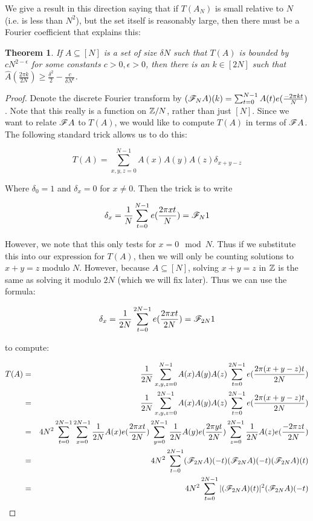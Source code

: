 \documentclass{article}
\newtheorem{theorem}{Theorem}[section]
\theoremstyle{definition}
\theoremstyle{remark}
\numberwithin{equation}{section}
\begin{document}
We give a result in this direction saying that if $T(A_N)$ is small
relative to $N$ (i.e. is less than $N^2$), but the set itself is
reasonably large, then there must be a Fourier coefficient that
explains this: 

\begin{theorem}\label{thm:alpha_finitary}
  If $A \subseteq [N]$ is a set of size $\delta N$ such that $T(A)$ is
  bounded by $c N^{2-\epsilon}$ for some constants
  $c > 0, \epsilon > 0$, then there is an $k \in [2N]$ such that
  $\widehat{A}(\frac{2\pi k}{2N}) \geq \frac{\delta^2}{2} - \frac{c}{\delta
    N^\epsilon}$.
\end{theorem}

\begin{proof}
  Denote the discrete Fourier transform by
  $(\mathscr{F}_N A)(k) = \sum_{t=0}^{N-1} A(t) e(\frac{-2\pi k t}{N})$.
  Note that this really is a function on $\mathbb{Z}/N$, rather than just
  $[N]$.  Since we want to relate $\mathscr{F} A$ to $T(A)$, we would like to
  compute $T(A)$ in terms of $\mathscr{F} A$.  The following standard trick
  allows us to do this: 

  \[T(A) = \sum_{x, y, z = 0}^{N-1} A(x)A(y)A(z)\delta_{x+y-z}\]

  Where $\delta_0 = 1$ and $\delta_x = 0$ for $x \neq 0$.  Then the
  trick is to write 

  \[\delta_x = \frac{1}{N} \sum_{t=0}^{N-1} e(\frac{2\pi x t}{N}) = \mathscr{F}_N 1\]

  However, we note that this only tests for $x = 0 \mod{N}$.  Thus if
  we substitute this into our expression for $T(A)$, then we will only
  be counting solutions to $x+y=z$ modulo $N$.  However, because
  $A \subseteq [N]$, solving $x+y=z$ in $\mathbb{Z}$ is the same as solving it
  modulo $2N$ (which we will fix later).  Thus we can use the formula:

  \[\delta_x = \frac{1}{2N} \sum_{t=0}^{2N-1} e(\frac{2\pi x t}{2N}) = \mathscr{F}_{2N} 1\]

  to compute: 

  \begin{eqnarray*}
    T(A) &=& \frac{1}{2N}\sum_{x, y, z = 0}^{N-1} A(x)A(y)A(z)\sum_{t=0}^{2N-1}
             e(\frac{2\pi (x+y-z) t}{2N})\\
         &=& \frac{1}{2N}\sum_{x, y, z = 0}^{2N-1} A(x)A(y)A(z)\sum_{t=0}^{2N-1}
             e(\frac{2\pi (x+y-z) t}{2N})\\
         &=& 4N^2 \sum_{t=0}^{2N-1}
             \sum_{x=0}^{2N-1} \frac{1}{2N} A(x)e(\frac{2\pi x t}{2N}) 
             \sum_{y=0}^{2N-1} \frac{1}{2N} A(y)e(\frac{2\pi y t}{2N}) 
             \sum_{z=0}^{2N-1} \frac{1}{2N} A(z)e(\frac{-2\pi z t}{2N})\\
         &=& 4 N^2 \sum_{t=0}^{2N-1} (\mathscr{F}_{2N}A)(-t)(\mathscr{F}_{2N}A)(-t)(\mathscr{F}_{2N}A)(t)\\
         &=& 4 N^2 \sum_{t=0}^{2N-1} |(\mathscr{F}_{2N}A)(t)|^2(\mathscr{F}_{2N}A)(-t)
  \end{eqnarray*}
  

\end{proof}
\end{document}

